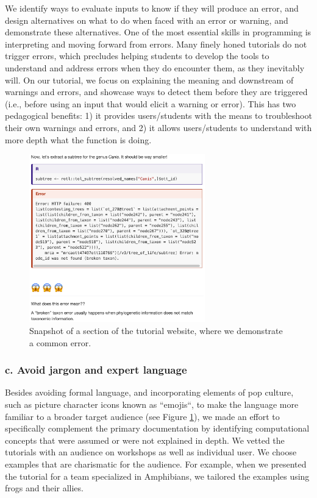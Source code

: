 \documentclass[12pt]{article}
\begin{document}
We identify ways to evaluate inputs to know if they will produce an error, and design
alternatives on what to do when faced with an error or warning, and demonstrate
these alternatives.
One of the most essential skills in programming is interpreting and moving forward
from errors.
Many finely honed tutorials do not trigger errors, which precludes helping students
to develop the tools to understand and address errors when they do encounter them,
as they inevitably will.
On our tutorial, we focus on explaining the meaning and downstream of warnings and errors, and
 showcase ways to detect them before they are triggered (i.e., before using an input
  that would elicit a warning or error). This has two pedagogical benefits:
1) it provides users/students with the means to troubleshoot their own warnings and errors, and
2) it allows users/students to understand with more depth what the function is doing.


\begin{figure}
\begin{center}
\includegraphics[width=3in]{fig1.png}
\end{center}
\caption{Snapshot of a section of the tutorial website, where we demonstrate a common error. \label{fig:first}}
\end{figure}

\subsubsection*{c. Avoid jargon and expert language}

Besides avoiding formal language, and incorporating elements of pop culture, such as picture
character icons known as ``emojis``, to make the language more familiar to a
broader target audience (see Figure \ref{fig:first}), we made an effort to specifically
complement the primary documentation by identifying
computational concepts that were assumed or were not explained in depth.
We vetted the tutorials with an audience on workshops as well as individual user.
We choose examples that are charismatic for the audience.
For example, when we presented the tutorial for a team specialized in Amphibians,
we tailored the examples using frogs and their allies.
\end{document}
